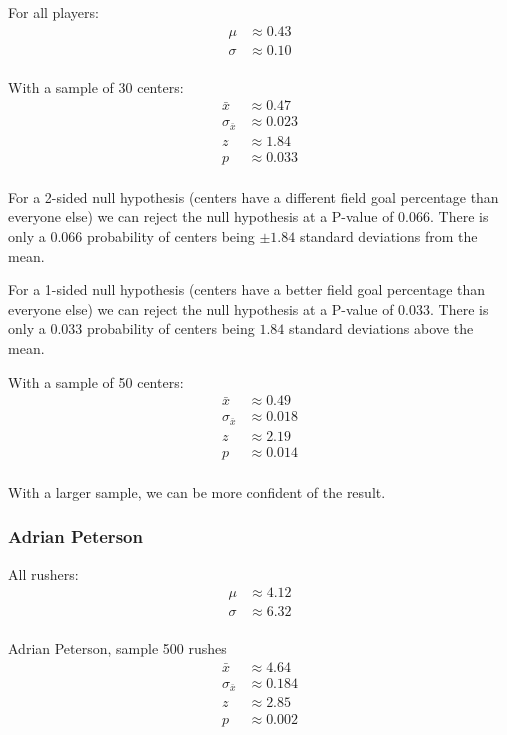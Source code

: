 \documentclass[landscape]{exam}
\begin{document}
  For all players:
  \begin{align*}
    \mu    & \approx 0.43 \\
    \sigma & \approx 0.10 \\
  \end{align*}

  With a sample of 30 centers:
  \begin{align*}
    \bar{x}          & \approx 0.47 \\
    \sigma_{\bar{x}} & \approx 0.023 \\
    z                & \approx 1.84 \\
    p                & \approx 0.033 \\
  \end{align*}

  For a 2-sided null hypothesis (centers have a different field goal percentage
  than everyone else) we can reject the null hypothesis at a P-value of 0.066.
  There is only a 0.066 probability of centers being $\pm 1.84$ standard
  deviations from the
  mean.

  For a 1-sided null hypothesis (centers have a better field goal percentage
  than everyone else) we can reject the null hypothesis at a P-value of 0.033.
  There is only a 0.033 probability of centers being $1.84$ standard deviations
  above the mean.

  With a sample of 50 centers:
  \begin{align*}
    \bar{x}          & \approx 0.49 \\
    \sigma_{\bar{x}} & \approx 0.018 \\
    z                & \approx 2.19 \\
    p                & \approx 0.014 \\
  \end{align*}

  With a larger sample, we can be more confident of the result.

  \subsubsection{Adrian Peterson}
  All rushers:
  \begin{align*}
    \mu    & \approx 4.12 \\
    \sigma & \approx 6.32 \\
  \end{align*}

  Adrian Peterson, sample 500 rushes
  \begin{align*}
    \bar{x}          & \approx 4.64 \\
    \sigma_{\bar{x}} & \approx 0.184 \\
    z                & \approx 2.85 \\
    p                & \approx 0.002 \\
  \end{align*}
\end{document}
